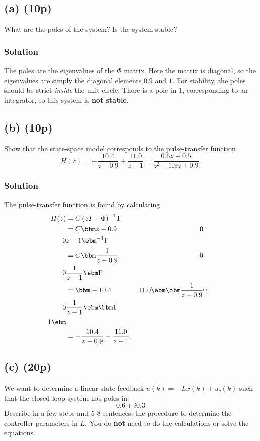 \documentclass{scrartcl}
\begin{document}
\subsection*{(a) (10p)}
\label{sec-3-1}
What are the poles of the system? Is the system stable?

\subsubsection*{Solution}
\label{sec-3-1-1}
The poles are the eigenvalues of the $\Phi$ matrix. Here the matrix is diagonal, so the eigenvalues are simply the diagonal elements $0.9$ and $1$. For stability, the poles should be strict \emph{inside} the unit circle. There is a pole in 1, corresponding to an integrator, so this system is \textbf{not stable}.

\subsection*{(b) (10p)}
\label{sec-3-2}
Show that the state-space model corresponds to the pulse-transfer function
\[ H(z) = -\frac{10.4}{z-0.9} + \frac{11.0}{z-1} = \frac{0.6z + 0.5}{z^2 - 1.9z + 0.9}. \]

\subsubsection*{Solution}
\label{sec-3-2-1}
The pulse-transfer function is found by calculating
\begin{equation*}
  \begin{split}
 H(z) &= C \left( zI - \Phi\right)^{-1} \Gamma\\
      &= C \bbm z-0.9 & 0\\0 & z-1 \ebm ^{-1} \Gamma \\
      &= C \bbm \frac{1}{z-0.9} & 0\\ 0 & \frac{1}{z-1} \ebm \Gamma \\
      &= \bbm -10.4 & 11.0 \ebm \bbm \frac{1}{z-0.9} & 0\\ 0 & \frac{1}{z-1} \ebm \bbm 1\\1\ebm \\
      &= - \frac{10.4}{z-0.9} + \frac{11.0}{z-1}.
  \end{split}
 \end{equation*}


\subsection*{(c) (20p)}
\label{sec-3-3}
We want to determine a linear state feedback $u(k) = -Lx(k) + u_c(k)$ such that the closed-loop system has poles in \[ 0.6 \pm i0.3 \] Describe in a few steps and 5-8 sentences, the procedure to determine the controller parameters in $L$. You do \textbf{not} need to do the calculations or solve the equations. 
\end{document}
